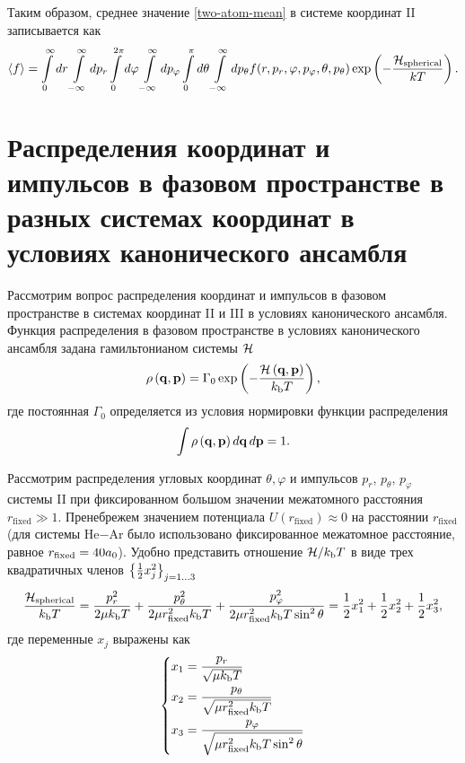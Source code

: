 Таким образом, среднее значение \eqref{two-atom-mean} в системе координат II записывается как
\begin{gather}
    \langle f \rangle = \int\limits_0^\infty dr \int\limits_{-\infty}^\infty dp_r \int\limits_0^{2\pi} d\varphi \int\limits_{-\infty}^\infty dp_\varphi \int\limits_0^\pi d\theta \int\limits_{-\infty}^\infty dp_\theta f(r, p_r, \varphi, p_\varphi, \theta, p_\theta) \exp \left( -\frac{\mathcal{H}_\text{spherical}}{k T} \right). \label{two-atom-mean-spherical}
\end{gather}

\section{Распределения координат и импульсов в фазовом пространстве в разных системах координат в условиях канонического ансамбля}

Рассмотрим вопрос распределения координат и импульсов в фазовом пространстве в системах координат II и III в условиях канонического ансамбля. Функция распределения в фазовом пространстве в условиях канонического ансамбля задана гамильтонианом системы $\mathcal{H}$ \cite{hill} 
\begin{gather}
    \rho \left( \mathbf{q}, \mathbf{p} \right) = \Gamma_0 \exp \left( -\frac{\mathcal{H} \left( \mathbf{q}, \mathbf{p} \right)}{k_\text{b} T} \right),
\end{gather}
% 
где постоянная $\Gamma_0$ определяется из условия нормировки функции распределения
\begin{gather}
    \int \rho \left( \mathbf{q}, \mathbf{p} \right) d \mathbf{q} \, d\mathbf{p} = 1.
\end{gather}

Рассмотрим распределения угловых координат $\theta, \varphi$ и импульсов $p_r$, $p_\theta$, $p_\varphi$ системы II при фиксированном большом значении межатомного расстояния $r_\text{fixed} \gg 1$. Пренебрежем значением потенциала $U(r_\text{fixed}) \approx 0$ на расстоянии $r_\text{fixed}$ (для системы He$-$Ar было использовано фиксированное межатомное расстояние, равное $r_\text{fixed} = 40 a_0$). Удобно представить отношение $\mathcal{H} / k_\text{b} T$ в виде трех квадратичных членов $\left\{ \frac{1}{2} x_j^2 \right\}_{j = 1 \dots 3}$
\begin{gather}
    \frac{\mathcal{H}_\text{spherical}}{k_\text{b} T} = \frac{p_r^2}{2 \mu k_\text{b} T} + \frac{p_\theta^2}{2 \mu r_\text{fixed}^2 k_\text{b} T} + \frac{p_\varphi^2}{2 \mu r_\text{fixed}^2 k_\text{b} T \sin^2 \theta} = \frac{1}{2} x_1^2 + \frac{1}{2} x_2^2 + \frac{1}{2} x_3^2, \label{two-atom-spherical-hamiltonian-xs} 
\end{gather}
%
где переменные $x_j$ выражены как
\begin{gather}
    \left\{
    \begin{aligned}
        x_1 &= \frac{p_r}{\sqrt{\mu k_\text{b} T}} \\
        x_2 &= \frac{p_\theta}{\sqrt{\mu r_\text{fixed}^2 k_\text{b} T}} \\
        x_3 &= \frac{p_\varphi}{\sqrt{\mu r_\text{fixed}^2 k_\text{b} T \sin^2 \theta}}
    \end{aligned}
\right. \label{two-atom-xs}
\end{gather}

